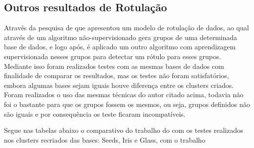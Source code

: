 
\begin{apendicesenv}

\partapendices

\chapter{Outros resultados de Rotulação }
\label{apendice:1}

Através da pesquisa de  que apresentou um modelo de rotulação de dados, ao qual através de um algoritmo não-supervisionado gera grupos de uma determinada base de dados, e logo após, é aplicado um outro algoritmo com aprendizagem supervisionada nesses grupos para detectar um rótulo para esses grupos. Mediante isso foram realizados testes com as mesmas bases de dados com finalidade de comparar os resultados, mas os testes não foram satisfatórios, embora algumas bases sejam iguais houve diferença entre os clusters criados. Foram realizados o uso das mesmas técnicas do autor citado acima, todavia não foi o bastante para que os grupos fossem os mesmos, ou seja, grupos definidos não são iguais e por consequência os teste ficaram incompatíveis.

Segue nas tabelas abaixo o comparativo do trabalho do \cite{Lopes2016} com os testes realizados nos clusters recriados das bases: Seeds, Iris e Glass, com o trabalho 


\end{apendicesenv}
